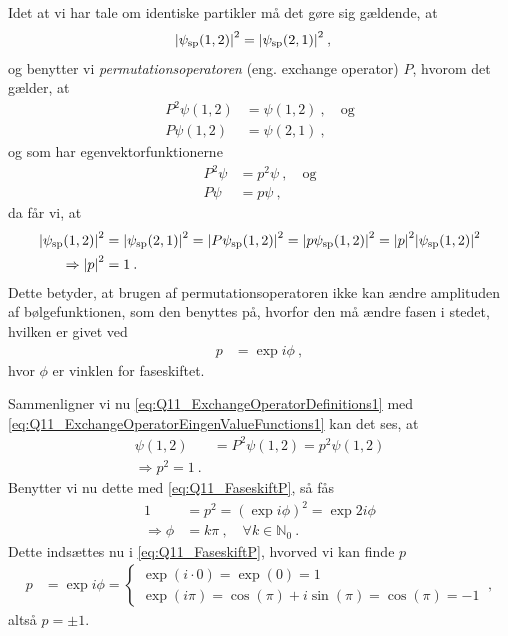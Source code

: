 Idet at vi har tale om identiske partikler må det gøre sig gældende, at
\begin{align}
    \abs{\psi_\text{sp}(1,2)}^2 &= \abs{\psi_\text{sp}(2,1)}^2 \: ,
\end{align}
og benytter vi \emph{permutationsoperatoren} (eng. exchange operator) $P$, hvorom det gælder, at
\begin{align}
    P^2 \psi(1,2) &= \psi(1,2) \: , \quad \text{og} \label{eq:Q11_ExchangeOperatorDefinitions1} \\
    P \psi(1,2) &= \psi(2,1) \: ,\label{eq:Q11_ExchangeOperatorDefinitions2}
\end{align}
og som har egenvektorfunktionerne
\begin{align}
    P^2 \psi &= p^2 \psi \: , \quad \text{og} \label{eq:Q11_ExchangeOperatorEingenValueFunctions1} \\
    P \psi &= p \psi \: , \label{eq:Q11_ExchangeOperatorEingenValueFunctions2}
\end{align}
da får vi, at
\begin{align}
    \abs{\psi_\text{sp}(1,2)}^2 &= \abs{\psi_\text{sp}(2,1)}^2
    = \abs{P\psi_\text{sp}(1,2)}^2
    = \abs{p\psi_\text{sp}(1,2)}^2
    = \abs{p}^2 \abs{\psi_\text{sp}(1,2)}^2 \nonumber\\
    \Rightarrow \abs{p}^2 &= 1 \: .
\end{align}
Dette betyder, at brugen af permutationsoperatoren ikke kan ændre amplituden af bølgefunktionen, som den benyttes på, hvorfor den må ændre fasen i stedet, hvilken er givet ved
\begin{align} \label{eq:Q11_FaseskiftP}
    p &= \exp{i\phi} \: ,
\end{align}
hvor $\phi$ er vinklen for faseskiftet.

Sammenligner vi nu \cref{eq:Q11_ExchangeOperatorDefinitions1} med \cref{eq:Q11_ExchangeOperatorEingenValueFunctions1} kan det ses, at
\begin{align}
    \psi(1,2) &= P^2 \psi(1,2) = p^2 \psi(1,2) \nonumber\\
    \Rightarrow p^2 = 1 \: .
\end{align}
Benytter vi nu dette med \cref{eq:Q11_FaseskiftP}, så fås
\begin{align}
    1 &= p^2 = \left(\exp{i\phi}\right)^2 = \exp{2i\phi} \nonumber\\
    \Rightarrow \phi &= k\pi \: , \quad \forall k \in \mathbb{N}_0 \: .
\end{align}
Dette indsættes nu i \cref{eq:Q11_FaseskiftP}, hvorved vi kan finde $p$
\begin{align}
    p &= \exp{i\phi} =
        \begin{cases}
            \exp(i \cdot 0) = \exp(0) = 1 \\
            \exp(i\pi) = \cos(\pi) + i\sin(\pi) = \cos(\pi) = -1
        \end{cases} \: ,
\end{align}
altså $p = \pm 1$.

